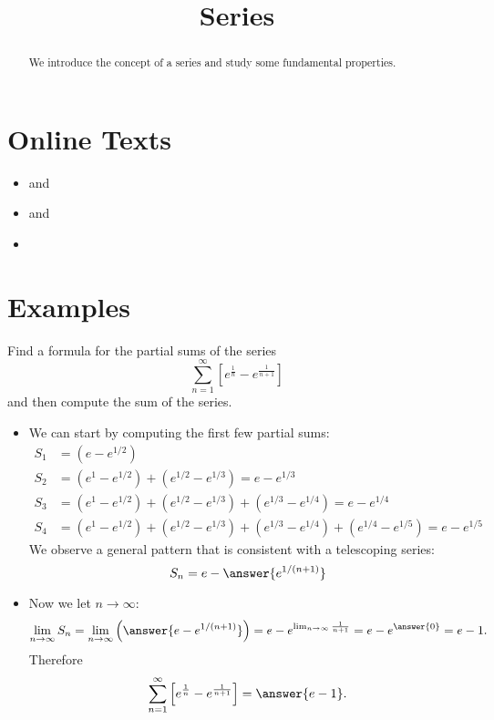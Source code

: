 \documentclass{ximera}
\title{Series}
\begin{document}
\begin{abstract}
We introduce the concept of a series and study some fundamental properties.
\end{abstract}
\maketitle

\section*{Online Texts}
\begin{itemize}
\item {} and 
\item {} and 
\item {}
\end{itemize}

\section*{Examples}

\begin{example}
Find a formula for the partial sums of the series
\[ \sum_{n=1}^\infty \left[ e^{\frac{1}{n}} - e^{\frac{1}{n+1}}\right]  \]
and then compute the sum of the series.
\begin{itemize}
\item We can start by computing the first few partial sums:
\[ \begin{aligned} 
S_1 & = (e - e^{1/2}) \\
S_2 & = (e^{1} - e^{1/2}) + (e^{1/2} - e^{1/3}) = e - e^{1/3} \\
S_3 & = (e^{1} - e^{1/2}) + (e^{1/2} - e^{1/3}) + (e^{1/3} - e^{1/4}) = e - e^{1/4} \\
S_4 & = (e^{1} - e^{1/2}) + (e^{1/2} - e^{1/3}) + (e^{1/3} - e^{1/4}) + (e^{1/4} - e^{1/5}) = e - e^{1/5} \end{aligned} \]
We observe a general pattern that is consistent with a telescoping series:
\[ S_n = e - \answer{e^{1/(n+1)}} \]
\item Now we let $n \rightarrow \infty$:
\[ \lim_{n \rightarrow \infty} S_n = \lim_{n \rightarrow \infty} \left( \answer{e - e^{1/(n+1)}} \right) = e - e^{\lim_{n \rightarrow \infty} \frac{1}{n+1}} = e - e^{\answer{0}} = e - 1. \]
Therefore
\[ \sum_{n=1}^\infty \left[ e^{\frac{1}{n}} - e^{\frac{1}{n+1}}\right] = \answer{e-1}. \]
\end{itemize}
\end{example}
\end{document}
